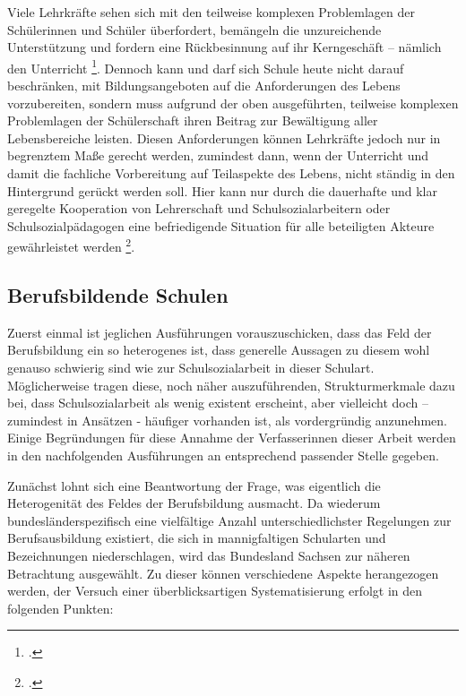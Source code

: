Viele Lehrkräfte sehen sich mit den teilweise komplexen Problemlagen der Schülerinnen und Schüler überfordert, bemängeln die unzureichende Unterstützung und fordern eine Rückbesinnung auf ihr Kerngeschäft -- nämlich den Unterricht \footcite[vgl.][10]{Drilling2009}. Dennoch kann und darf sich Schule heute nicht darauf beschränken, mit Bildungsangeboten auf die Anforderungen des Lebens vorzubereiten, sondern muss aufgrund der oben ausgeführten, teilweise komplexen Problemlagen der Schülerschaft ihren Beitrag zur Bewältigung aller Lebensbereiche leisten. Diesen Anforderungen können Lehrkräfte jedoch nur in begrenztem Maße gerecht werden, zumindest dann, wenn der Unterricht und damit die fachliche Vorbereitung auf Teilaspekte des Lebens, nicht ständig in den Hintergrund gerückt werden soll. Hier kann nur durch die dauerhafte und klar geregelte Kooperation von Lehrerschaft und Schulsozialarbeitern oder Schulsozialpädagogen eine befriedigende Situation für alle beteiligten Akteure gewährleistet werden \footcite[vgl.][9ff]{Drilling2009}. 

\subsection{Berufsbildende Schulen}
\label{sec:BerufsbildendeSchulen}
   
Zuerst einmal ist jeglichen Ausführungen vorauszuschicken, dass das Feld der Berufsbildung ein so heterogenes ist, dass generelle Aussagen zu diesem wohl genauso schwierig sind wie zur Schulsozialarbeit in dieser Schulart. Möglicherweise tragen diese, noch näher auszuführenden, Strukturmerkmale dazu bei, dass Schulsozialarbeit als wenig existent erscheint, aber vielleicht doch -- zumindest in Ansätzen - häufiger vorhanden ist, als vordergründig anzunehmen. Einige Begründungen für diese Annahme der Verfasserinnen dieser Arbeit werden in den nachfolgenden Ausführungen an entsprechend passender Stelle gegeben. 

Zunächst lohnt sich eine Beantwortung der Frage, was eigentlich die Heterogenität des Feldes der Berufsbildung ausmacht. Da wiederum bundesländerspezifisch eine vielfältige Anzahl unterschiedlichster Regelungen zur Berufsausbildung existiert, die sich in mannigfaltigen Schularten und Bezeichnungen niederschlagen, wird das Bundesland Sachsen zur näheren Betrachtung ausgewählt. Zu dieser können verschiedene Aspekte herangezogen werden, der Versuch einer überblicksartigen Systematisierung erfolgt in den folgenden Punkten:\\

